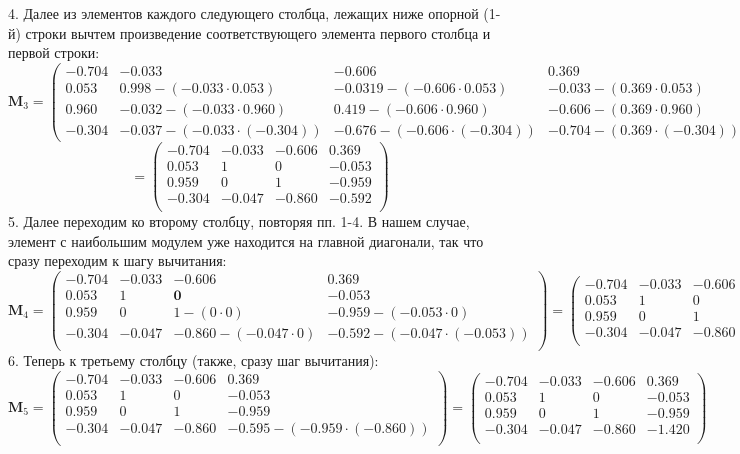 \documentclass[a4paper]{article}
\begin{document}
4. Далее из элементов каждого следующего столбца, лежащих ниже опорной (1-й) строки вычтем произведение соответствующего элемента первого столбца и первой строки:
\[
\mathbf{M}_3 =
\begin{pmatrix}
    -0.704 & \mathbf{-0.033}  & \mathbf{-0.606}  & \mathbf{0.369}\\
    \mathit{0.053} &   0.998-(-0.033\cdot0.053) & -0.0319-(-0.606\cdot0.053) & -0.033-(0.369\cdot0.053) \\
    \mathit{0.960} & -0.032-(-0.033\cdot0.960)  &  0.419-(-0.606\cdot0.960) &  -0.606-(0.369\cdot0.960) \\
    \mathit{-0.304} & -0.037-(-0.033\cdot(-0.304)) & -0.676-(-0.606\cdot(-0.304)) &  -0.704-(0.369\cdot(-0.304))
\end{pmatrix}=
\]
\[
=
\begin{pmatrix}
    -0.704 & -0.033 & -0.606 &  0.369 \\
     0.053 &  1     &  0     & -0.053 \\
     0.959 &  0     &  1     & -0.959\\
    -0.304 & -0.047 & -0.860 & -0.592 \\
\end{pmatrix}
\]
5. Далее переходим ко второму столбцу, повторяя пп. 1-4. В нашем случае, элемент с наибольшим модулем уже находится на главной диагонали, так что сразу переходим к шагу вычитания:
\[
\mathbf{M}_4 =
\begin{pmatrix}
    -0.704 & -0.033 & -0.606 &  0.369 \\
    0.053 &  1     &  \mathbf{0}     & \mathbf{-0.053} \\
    0.959 &  \mathit{0}     &  1-(0\cdot0)     & -0.959-(-0.053\cdot0)\\
    -0.304 & \mathit{-0.047} & -0.860-(-0.047\cdot0) & -0.592-(-0.047\cdot(-0.053)) \\
\end{pmatrix} =
\begin{pmatrix}
    -0.704 & -0.033 & -0.606 &  0.369 \\
    0.053 &  1     &  0     & -0.053 \\
    0.959 &  0     &  1     & -0.959\\
    -0.304 & -0.047 & -0.860 & -0.595 \\
\end{pmatrix}
\]
6. Теперь к третьему столбцу (также, сразу шаг вычитания):
\[
\mathbf{M}_5 =
\begin{pmatrix}
    -0.704 & -0.033 & -0.606 &  0.369 \\
    0.053 &  1     &  0     & -0.053 \\
    0.959 &  0     &  1     & \mathbf{-0.959}\\
    -0.304 & -0.047 & \mathit{-0.860} & -0.595-(-0.959\cdot(-0.860)) \\
\end{pmatrix} =
\begin{pmatrix}
    -0.704 & -0.033 & -0.606 &  0.369 \\
    0.053 &  1     &  0     & -0.053 \\
    0.959 &  0     &  1     & -0.959\\
    -0.304 & -0.047 & -0.860 & -1.420 \\
\end{pmatrix}
\]
\end{document}
